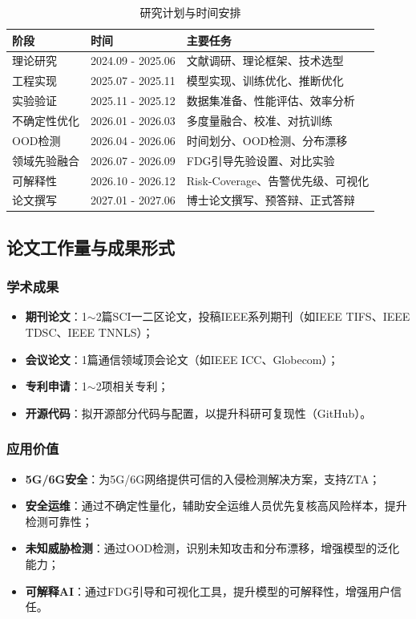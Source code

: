 \begin{table}[h]
\centering
\begin{tabular}{lll}
\hline
\textbf{阶段} & \textbf{时间} & \textbf{主要任务} \\
\hline
理论研究 & 2024.09 - 2025.06 & 文献调研、理论框架、技术选型 \\
工程实现 & 2025.07 - 2025.11 & 模型实现、训练优化、推断优化 \\
实验验证 & 2025.11 - 2025.12 & 数据集准备、性能评估、效率分析 \\
不确定性优化 & 2026.01 - 2026.03 & 多度量融合、校准、对抗训练 \\
OOD检测 & 2026.04 - 2026.06 & 时间划分、OOD检测、分布漂移 \\
领域先验融合 & 2026.07 - 2026.09 & FDG引导先验设置、对比实验 \\
可解释性 & 2026.10 - 2026.12 & Risk-Coverage、告警优先级、可视化 \\
论文撰写 & 2027.01 - 2027.06 & 博士论文撰写、预答辩、正式答辩 \\
\hline
\end{tabular}
\caption{研究计划与时间安排}
\end{table}

\subsection{论文工作量与成果形式}

\subsubsection{学术成果}

\begin{itemize}
  \item \textbf{期刊论文}：1$\sim$2篇SCI一二区论文，投稿IEEE系列期刊（如IEEE TIFS、IEEE TDSC、IEEE TNNLS）；
  \item \textbf{会议论文}：1篇通信领域顶会论文（如IEEE ICC、Globecom）；
  \item \textbf{专利申请}：1$\sim$2项相关专利；
  \item \textbf{开源代码}：拟开源部分代码与配置，以提升科研可复现性（GitHub）。
\end{itemize}

\subsubsection{应用价值}

\begin{itemize}
  \item \textbf{5G/6G安全}：为5G/6G网络提供可信的入侵检测解决方案，支持ZTA；
  \item \textbf{安全运维}：通过不确定性量化，辅助安全运维人员优先复核高风险样本，提升检测可靠性；
  \item \textbf{未知威胁检测}：通过OOD检测，识别未知攻击和分布漂移，增强模型的泛化能力；
  \item \textbf{可解释AI}：通过FDG引导和可视化工具，提升模型的可解释性，增强用户信任。
\end{itemize}

